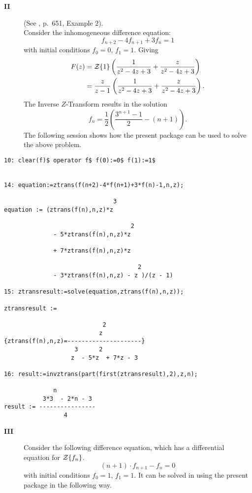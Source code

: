 \begin{description}
\item[\textbf{II}] (See \cite{Bronstein:1981}, p.\ 651, Example 2).\\
  Consider the inhomogeneous difference equation:
  \[ f_{n+2} - 4 f_{n+1} + 3 f_{n} = 1 \]
  with initial conditions $f_0=0$, $f_1=1$. Giving
  \begin{align*}
    F(z) &= {\cal Z}\{1\} \left( \frac{1}{z^2-4z+3} +
    \frac{z}{z^2-4z+3} \right) \\
         &= \frac{z}{z-1} \left( \frac{1}{z^2-4z+3} + \frac{z}{z^2-4z+3}
    \right).
  \end{align*}
  The Inverse $Z$-Transform results in the solution
  \[f_n = \frac{1}{2} \left( \frac{3^{n+1}-1}{2}-(n+1) \right).\]
  The following \REDUCE session shows how the present package can be
  used to solve the above problem.
\end{description}

\begin{verbatim}
10: clear(f)$ operator f$ f(0):=0$ f(1):=1$


14: equation:=ztrans(f(n+2)-4*f(n+1)+3*f(n)-1,n,z);

                               3
equation := (ztrans(f(n),n,z)*z

                                    2
              - 5*ztrans(f(n),n,z)*z

              + 7*ztrans(f(n),n,z)*z

                                      2
              - 3*ztrans(f(n),n,z) - z )/(z - 1)

15: ztransresult:=solve(equation,ztrans(f(n),n,z));

ztransresult := 

                            2
                           z
{ztrans(f(n),n,z)=---------------------}
                    3      2
                   z  - 5*z  + 7*z - 3

16: result:=invztrans(part(first(ztransresult),2),z,n);

              n
           3*3  - 2*n - 3
result := ----------------
                 4
\end{verbatim}

\begin{description}
\item[\textbf{III}] Consider the following difference equation, which has
  a differential equation for ${\cal Z}\{f_n\}$.
  \[ (n+1) \cdot f_{n+1}-f_n=0\]
  with initial conditions $f_0=1$, $f_1=1$.  It can be solved in
  \REDUCE using the present package in the following way.
\end{description}

